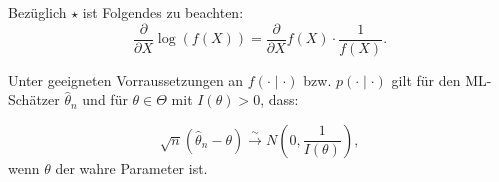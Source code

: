 \documentclass[10pt]{article}
\newcommand{\KV}{\overset{\sim} \longrightarrow} %
\begin{document}
	\begin{Bemerkung}
		Bezüglich $\star$ ist Folgendes zu beachten:
		\begin{equation} \label{logab}
			\frac{\partial}{\partial X} \log (f(X)) = \frac{\partial}{\partial X} f(X) \cdot \frac{1}{f(X)}.
		\end{equation} 
	\end{Bemerkung}
	
	\begin{Satz}
		Unter geeigneten Vorraussetzungen an $f(\cdot \mid \cdot)$ bzw. $p(\cdot \mid \cdot)$ gilt für den ML-Schätzer $\hat{\theta}_n$ und für $\theta \in \Theta$ mit $I(\theta) > 0$, dass:
		
		\begin{equation*}
			\sqrt{n}(\hat{\theta}_n - \theta) \KV N\left(0,\frac{1}{I(\theta)}\right),
		\end{equation*}
		wenn $\theta$ der wahre Parameter ist. 
	\end{Satz}
	
\end{document}

